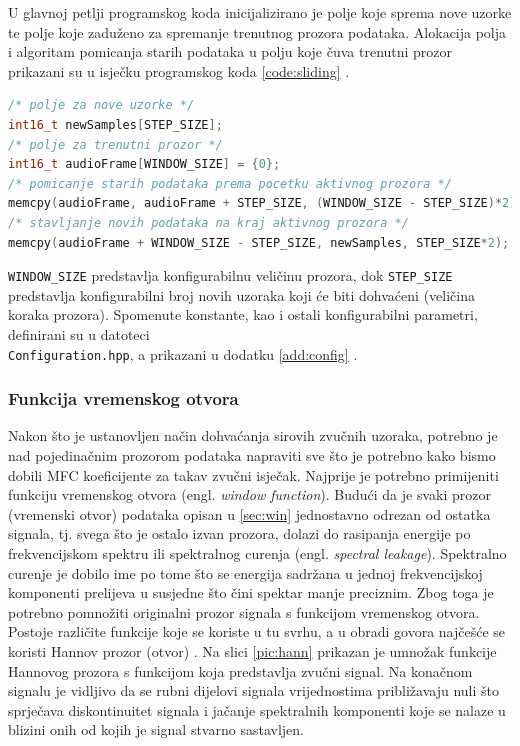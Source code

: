 U glavnoj petlji programskog koda inicijalizirano je polje koje sprema nove uzorke te 
polje koje zaduženo za spremanje trenutnog prozora podataka. Alokacija polja i algoritam
pomicanja starih podataka u polju koje čuva trenutni prozor prikazani su u isječku programskog
koda \ref{code:sliding} .

\begin{lstlisting}[language=C++, caption=Algoritam za korištenje novodohvaćenih podataka, label=code:sliding]
/* polje za nove uzorke */
int16_t newSamples[STEP_SIZE];
/* polje za trenutni prozor */
int16_t audioFrame[WINDOW_SIZE] = {0};
/* pomicanje starih podataka prema pocetku aktivnog prozora */
memcpy(audioFrame, audioFrame + STEP_SIZE, (WINDOW_SIZE - STEP_SIZE)*2);
/* stavljanje novih podataka na kraj aktivnog prozora */
memcpy(audioFrame + WINDOW_SIZE - STEP_SIZE, newSamples, STEP_SIZE*2);
\end{lstlisting}

\texttt{WINDOW\_SIZE} predstavlja konfigurabilnu veličinu prozora, dok \texttt{STEP\_SIZE} predstavlja 
konfigurabilni broj novih uzoraka koji će biti dohvaćeni (veličina koraka prozora).
Spomenute konstante, kao i ostali konfigurabilni parametri, definirani su u 
datoteci \\ \texttt{Configuration.hpp}, a prikazani u dodatku \ref{add:config} .

\subsubsection{Funkcija vremenskog otvora}
Nakon što je ustanovljen način dohvaćanja sirovih zvučnih uzoraka, potrebno je
nad pojedinačnim prozorom podataka napraviti sve što je potrebno kako bismo
dobili MFC koeficijente za takav zvučni isječak. Najprije je potrebno primijeniti funkciju vremenskog otvora
(engl. \textit{window function}). Budući da je svaki
prozor (vremenski otvor) podataka opisan u \ref{sec:win} jednostavno odrezan od ostatka
signala, tj. svega što je ostalo izvan prozora, dolazi do rasipanja energije po
frekvencijskom spektru ili spektralnog curenja (engl. \textit{spectral leakage}). Spektralno curenje
je dobilo ime po tome što se energija sadržana u jednoj frekvencijskoj komponenti prelijeva
u susjedne što čini spektar manje preciznim.
Zbog toga je potrebno pomnožiti originalni prozor signala s funkcijom vremenskog otvora. Postoje
različite funkcije koje se koriste u tu svrhu, a u obradi govora najčešće se koristi
Hannov prozor (otvor) \cite{windowing}.
Na slici \ref{pic:hann} prikazan je umnožak funkcije Hannovog prozora s funkcijom
koja predstavlja zvučni signal. Na konačnom signalu je vidljivo da se rubni dijelovi
signala vrijednostima približavaju nuli što sprječava diskontinuitet signala i jačanje
spektralnih komponenti koje se nalaze u blizini onih od kojih je signal stvarno sastavljen.

